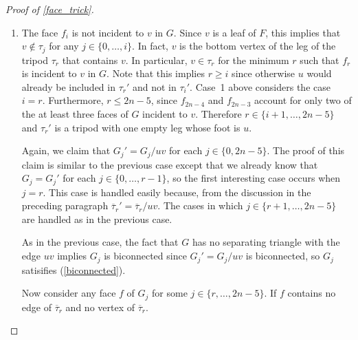 \documentclass{patmorin}
\begin{document}
\begin{proof}[Proof of \cref{face_trick}]
\begin{enumerate}
    Since $G_j'=G_j/uv$, there is an injective function from the faces of $G_j'$ onto the faces of $G_j$.  Therefore, for any face $f\not\in\{f_{2n-3},f_{2n-4}\}$ of $G_j$ there is a corresponding face $f'$ of $G_j'$.  It is straightforward to verify that $J_\mathcal{F}(f)=J_\mathcal{F'}(f')$ and therefore $f$ satisfies (\ref{three_faces}) since $f'$ satisfies (\ref{three_faces}).

    \item The face $f_i$ is not incident to $v$ in $G$.  Since $v$ is a leaf of $F$, this implies that $v\not\in \tau_j$ for any $j\in\{0,\ldots,i\}$.  In fact, $v$ is the bottom vertex of the leg of the tripod $\tau_r$ that contains $v$.  In particular, $v\in\tau_r$ for the minimum $r$ such that $f_r$ is incident to $v$ in $G$.  Note that this implies $r\ge i$ since otherwise $u$ would already be included in $\tau_r'$ and not in $\tau_i'$. Case~1 above considers the case $i=r$.  Furthermore, $r\le 2n-5$, since  $f_{2n-4}$ and $f_{2n-3}$ account for only two of the at least three faces of $G$ incident to $v$.  Therefore $r\in\{i+1,\ldots,2n-5\}$ and $\tau_r'$ is a tripod with one empty leg whose foot is $u$.

    Again, we claim that $G_j'=G_j/uv$ for each $j\in\{0,2n-5\}$.  The proof of this claim is similar to the previous case except that we already know that $G_j=G_j'$ for each $j\in\{0,\ldots,r-1\}$, so the first interesting case occurs when $j=r$. This case is handled easily because, from the discussion in the preceding paragraph $\overline{\tau}_r'=\overline{\tau}_r/uv$.  The cases in which $j\in\{r+1,\ldots,2n-5\}$ are handled as in the previous case.

    As in the previous case, the fact that $G$ has no separating triangle with the edge $uv$ implies $G_j$ is biconnected since $G_j'=G_j/uv$ is biconnected, so $G_j$ satisifies (\ref{biconnected}).



    Now consider any face $f$ of $G_j$ for some $j\in\{r,\ldots,2n-5\}$.  If $f$ contains no edge of $\overline{\tau}_r$ and no vertex of $\overline{\tau}_r$.


\end{enumerate}
\end{proof}
\end{document}
